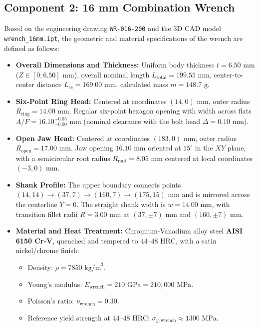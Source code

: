 \documentclass[12pt,a4paper]{article}
\begin{document}
\subsection{Component 2: 16 mm Combination Wrench}
Based on the engineering drawing \texttt{WR-016-200} and the 3D CAD model \texttt{wrench\_16mm.ipt}, the geometric and material specifications of the wrench are defined as follows:
\begin{itemize}
    \item \textbf{Overall Dimensions and Thickness:} Uniform body thickness $t = 6.50\text{ mm}$ ($Z \in [0; 6.50]\text{ mm}$), overall nominal length $L_{\text{total}} = 199.55\text{ mm}$, center-to-center distance $L_{cc} = 169.00\text{ mm}$, calculated mass $m = 148.7\text{ g}$.
    \item \textbf{Six-Point Ring Head:} Centered at coordinates $(14, 0)\text{ mm}$, outer radius $R_{\text{ring}} = 14.00\text{ mm}$. Regular six-point hexagon opening with width across flats $A/F = 16.10^{+0.05}_{-0.00}\text{ mm}$ (nominal clearance with the bolt head $\Delta = 0.10\text{ mm}$).
    \item \textbf{Open Jaw Head:} Centered at coordinates $(183, 0)\text{ mm}$, outer radius $R_{\text{open}} = 17.00\text{ mm}$. Jaw opening $16.10\text{ mm}$ oriented at $15^\circ$ in the $XY$ plane, with a semicircular root radius $R_{\text{root}} = 8.05\text{ mm}$ centered at local coordinates $(-3, 0)\text{ mm}$.
    \item \textbf{Shank Profile:} The upper boundary connects points $(14, 14) \rightarrow (37, 7) \rightarrow (160, 7) \rightarrow (175, 15)\text{ mm}$ and is mirrored across the centerline $Y = 0$. The straight shank width is $w = 14.00\text{ mm}$, with transition fillet radii $R = 3.00\text{ mm}$ at $(37, \pm 7)\text{ mm}$ and $(160, \pm 7)\text{ mm}$.
    \item \textbf{Material and Heat Treatment:} Chromium-Vanadium alloy steel \textbf{AISI 6150 Cr-V}, quenched and tempered to $44\text{--}48\text{ HRC}$, with a satin nickel/chrome finish:
    \begin{itemize}
        \item Density: $\rho = 7850\text{ kg/m}^3$.
        \item Young's modulus: $E_{\text{wrench}} = 210\text{ GPa} = 210,000\text{ MPa}$.
        \item Poisson's ratio: $\nu_{\text{wrench}} = 0.30$.
        \item Reference yield strength at $44\text{--}48\text{ HRC}$: $\sigma_{y,\text{wrench}} \approx 1300\text{ MPa}$.
    \end{itemize}
\end{itemize}
\end{document}
